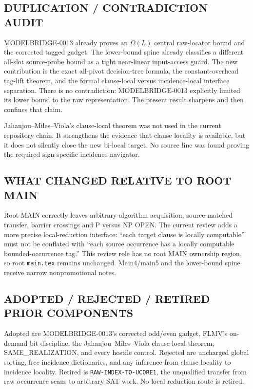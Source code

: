 \documentclass[11pt]{article}
\begin{document}
\subsection*{DUPLICATION / CONTRADICTION AUDIT}
MODELBRIDGE-0013 already proves an $\Omega(L)$ central raw-locator bound and
the corrected tagged gadget.  The lower-bound spine already classifies a
different all-slot source-probe bound as a tight near-linear input-access
guard.  The new contribution is the exact all-pivot decision-tree formula,
the constant-overhead tag-lift theorem, and the formal clause-local versus
incidence-local interface separation.  There is no contradiction:
MODELBRIDGE-0013 explicitly limited its lower bound to the raw representation.
The present result sharpens and then confines that claim.

Jahanjou--Miles--Viola's clause-local theorem was not used in the current
repository chain.  It strengthens the evidence that clause locality is
available, but it does not silently close the new bi-local target.  No source
line was found proving the required sign-specific incidence navigator.

\subsection*{WHAT CHANGED RELATIVE TO ROOT MAIN}
Root MAIN correctly leaves arbitrary-algorithm acquisition, source-matched
transfer, barrier crossings and P versus NP OPEN.  The current review adds a
more precise local-reduction interface: ``each target clause is locally
computable'' must not be conflated with ``each source occurrence has a
locally computable bounded-occurrence tag.''  This review role has no root
MAIN ownership region, so root \texttt{main.tex} remains unchanged.
Main4/main5 and the lower-bound spine receive narrow nonpromotional notes.

\subsection*{ADOPTED / REJECTED / RETIRED PRIOR COMPONENTS}
Adopted are MODELBRIDGE-0013's corrected odd/even gadget, FLMV's on-demand
bit discipline, the Jahanjou--Miles--Viola clause-local theorem,
SAME\_REALIZATION, and every hostile control.  Rejected are uncharged global
sorting, free incidence dictionaries, and any inference from clause locality
to incidence locality.  Retired is \texttt{RAW-INDEX-TO-UCORE1}, the
unqualified transfer from raw occurrence scans to arbitrary SAT work.  No
local-reduction route is retired.
\end{document}
